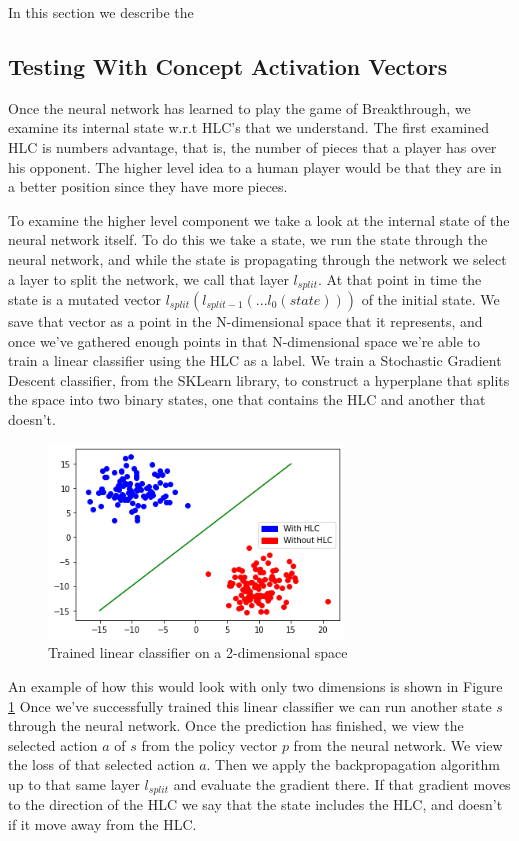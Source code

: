 In this section we describe the 

\subsection{Testing With Concept Activation Vectors}

Once the neural network has learned to play the game of Breakthrough, we examine its internal state w.r.t HLC's that we understand. The first examined HLC is numbers advantage, that is, the number of pieces that a player has over his opponent. The higher level idea to a human player would be that they are in a better position since they have more pieces.

To examine the higher level component we take a look at the internal state of the neural network itself. To do this we take a state, we run the state through the neural network, and while the state is propagating through the network we select a layer to split the network, we call that layer $l_{split}$. At that point in time the state is a mutated vector $l_{split}(l_{split-1}(...l_0(state)))$ of the initial state. We save that vector as a point in the N-dimensional space that it represents, and once we've gathered enough points in that N-dimensional space we're able to train a linear classifier using the HLC as a label. We train a Stochastic Gradient Descent classifier, from the SKLearn library, to construct a hyperplane that splits the space into two binary states, one that contains the HLC and another that doesn't. 
\begin{figure}[]
    \centering
    \includegraphics[width=0.7\textwidth]{graphics/linear_separation}
    \caption{Trained linear classifier on a 2-dimensional space}
    \label{fig:scattersplit}
\end{figure}
An example of how this would look with only two dimensions is shown in Figure \ref{fig:scattersplit} Once we've successfully trained this linear classifier we can run another state $s$ through the neural network. Once the prediction has finished, we view the selected action $a$ of $s$ from the policy vector $p$ from the neural network. We view the loss of that selected action $a$. Then we apply the backpropagation algorithm up to that same layer $l_{split}$ and evaluate the gradient there. If that gradient moves to the direction of the HLC we say that the state includes the HLC, and doesn't if it move away from the HLC.
